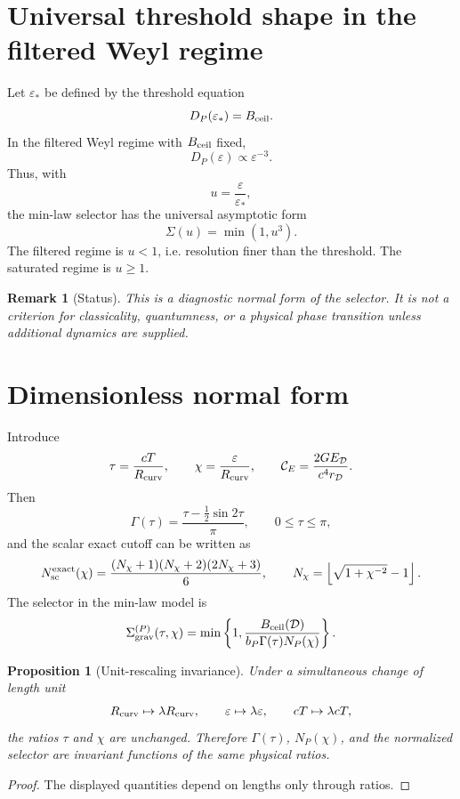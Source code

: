 \documentclass[11pt,a4paper]{article}
\newtheorem{proposition}[theorem]{Proposition}
\newtheorem{remark}[theorem]{Remark}
\begin{document}
\section{Universal threshold shape in the filtered Weyl regime}
\label{app:universal-threshold-shape}

Let \(\varepsilon_*\) be defined by the threshold equation
\[
D_P(\varepsilon_*)=B_{\rm ceil}.
\]
In the filtered Weyl regime with \(B_{\rm ceil}\) fixed,
\[
D_P(\varepsilon)\propto\varepsilon^{-3}.
\]
Thus, with
\[
u=\frac{\varepsilon}{\varepsilon_*},
\]
the min-law selector has the universal asymptotic form
\[
\Sigma(u)=\min(1,u^3).
\]
The filtered regime is \(u<1\), i.e. resolution finer than the threshold.  The saturated regime is \(u\ge1\).

\begin{remark}[Status]
This is a diagnostic normal form of the selector.  It is not a criterion for classicality, quantumness, or a physical phase transition unless additional dynamics are supplied.
\end{remark}

\section{Dimensionless normal form}
\label{sec:dimensionless-normal-form}

Introduce
\[
\tau=\frac{cT}{R_{\rm curv}},
\qquad
\chi=\frac{\varepsilon}{R_{\rm curv}},
\qquad
\mathcal C_E=\frac{2GE_{\mathcal D}}{c^4r_{\mathcal D}}.
\]
Then
\[
\Gamma(\tau)=\frac{\tau-\frac12\sin2\tau}{\pi},
\qquad
0\le\tau\le\pi,
\]
and the scalar exact cutoff can be written as
\[
N_{\rm sc}^{\rm exact}(\chi)=
\frac{(N_\chi+1)(N_\chi+2)(2N_\chi+3)}{6},
\qquad
N_\chi=\left\lfloor\sqrt{1+\chi^{-2}}-1\right\rfloor.
\]
The selector in the min-law model is
\[
\Sigma_{\rm grav}^{(P)}(\tau,\chi)
=
\min\left\{1,\frac{B_{\rm ceil}(\mathcal D)}
{b_P\Gamma(\tau)N_P(\chi)}\right\}.
\]

\begin{proposition}[Unit-rescaling invariance]
Under a simultaneous change of length unit
\[
R_{\rm curv}\mapsto\lambda R_{\rm curv},
\qquad
\varepsilon\mapsto\lambda\varepsilon,
\qquad
cT\mapsto\lambda cT,
\]
the ratios $\tau$ and $\chi$ are unchanged.  Therefore $\Gamma(\tau)$, $N_P(\chi)$, and the normalized selector are invariant functions of the same physical ratios.
\end{proposition}
\begin{proof}
The displayed quantities depend on lengths only through ratios.
\end{proof}
\end{document}
